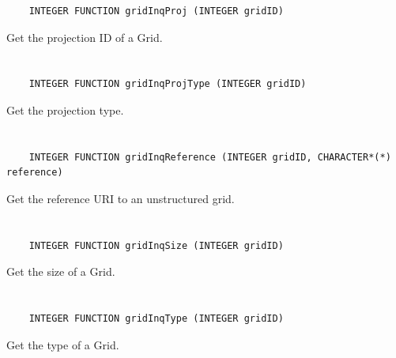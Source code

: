 \begin{verbatim}
    INTEGER FUNCTION gridInqProj (INTEGER gridID)
\end{verbatim}

Get the projection ID of a Grid.


\section*{\tt {}}

\begin{verbatim}
    INTEGER FUNCTION gridInqProjType (INTEGER gridID)
\end{verbatim}

Get the projection type.


\section*{\tt {}}

\begin{verbatim}
    INTEGER FUNCTION gridInqReference (INTEGER gridID, CHARACTER*(*) reference)
\end{verbatim}

Get the reference URI to an unstructured grid.


\section*{\tt {}}

\begin{verbatim}
    INTEGER FUNCTION gridInqSize (INTEGER gridID)
\end{verbatim}

Get the size of a Grid.


\section*{\tt {}}

\begin{verbatim}
    INTEGER FUNCTION gridInqType (INTEGER gridID)
\end{verbatim}

Get the type of a Grid.


\section*{\tt {}}

